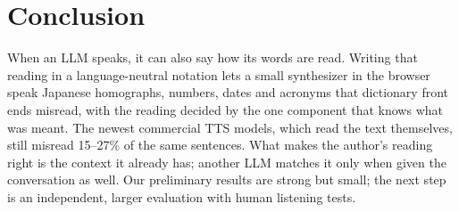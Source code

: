 \documentclass[11pt,a4paper]{article}
\begin{document}
\section{Conclusion}

When an LLM speaks, it can also say how its words are read. Writing that reading in a language-neutral notation lets a
small synthesizer in the browser speak Japanese homographs, numbers, dates and acronyms that dictionary front ends
misread, with the reading decided by the one component that knows what was meant. The newest commercial TTS models,
which read the text themselves, still misread 15--27\% of the same sentences. What makes the author's reading right is
the context it already has; another LLM matches it only when given the conversation as well. Our preliminary results
are strong
but small; the next step is an independent, larger evaluation with human listening tests.



\end{document}
